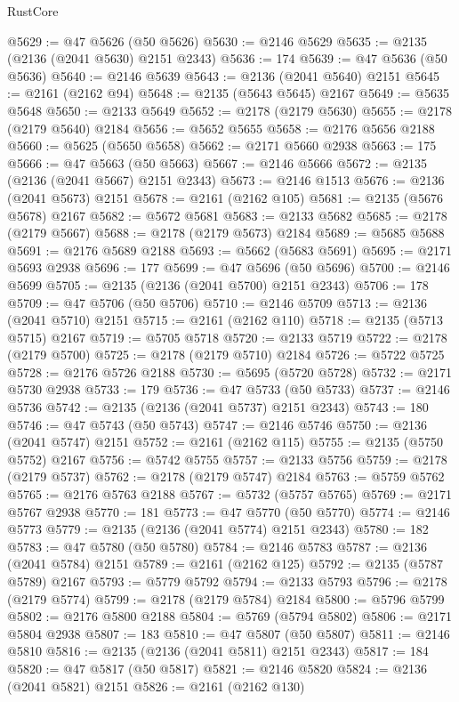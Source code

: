 \begin{lexlean}{RustCore}
\begin{coremodule}
@5629 := @47 @5626 (@50 @5626)
@5630 := @2146 @5629
@5635 := @2135 (@2136 (@2041 @5630) @2151 @2343)
@5636 := 174
@5639 := @47 @5636 (@50 @5636)
@5640 := @2146 @5639
@5643 := @2136 (@2041 @5640) @2151
@5645 := @2161 (@2162 @94)
@5648 := @2135 (@5643 @5645) @2167
@5649 := @5635 @5648
@5650 := @2133 @5649
@5652 := @2178 (@2179 @5630)
@5655 := @2178 (@2179 @5640) @2184
@5656 := @5652 @5655
@5658 := @2176 @5656 @2188
@5660 := @5625 (@5650 @5658)
@5662 := @2171 @5660 @2938
@5663 := 175
@5666 := @47 @5663 (@50 @5663)
@5667 := @2146 @5666
@5672 := @2135 (@2136 (@2041 @5667) @2151 @2343)
@5673 := @2146 @1513
@5676 := @2136 (@2041 @5673) @2151
@5678 := @2161 (@2162 @105)
@5681 := @2135 (@5676 @5678) @2167
@5682 := @5672 @5681
@5683 := @2133 @5682
@5685 := @2178 (@2179 @5667)
@5688 := @2178 (@2179 @5673) @2184
@5689 := @5685 @5688
@5691 := @2176 @5689 @2188
@5693 := @5662 (@5683 @5691)
@5695 := @2171 @5693 @2938
@5696 := 177
@5699 := @47 @5696 (@50 @5696)
@5700 := @2146 @5699
@5705 := @2135 (@2136 (@2041 @5700) @2151 @2343)
@5706 := 178
@5709 := @47 @5706 (@50 @5706)
@5710 := @2146 @5709
@5713 := @2136 (@2041 @5710) @2151
@5715 := @2161 (@2162 @110)
@5718 := @2135 (@5713 @5715) @2167
@5719 := @5705 @5718
@5720 := @2133 @5719
@5722 := @2178 (@2179 @5700)
@5725 := @2178 (@2179 @5710) @2184
@5726 := @5722 @5725
@5728 := @2176 @5726 @2188
@5730 := @5695 (@5720 @5728)
@5732 := @2171 @5730 @2938
@5733 := 179
@5736 := @47 @5733 (@50 @5733)
@5737 := @2146 @5736
@5742 := @2135 (@2136 (@2041 @5737) @2151 @2343)
@5743 := 180
@5746 := @47 @5743 (@50 @5743)
@5747 := @2146 @5746
@5750 := @2136 (@2041 @5747) @2151
@5752 := @2161 (@2162 @115)
@5755 := @2135 (@5750 @5752) @2167
@5756 := @5742 @5755
@5757 := @2133 @5756
@5759 := @2178 (@2179 @5737)
@5762 := @2178 (@2179 @5747) @2184
@5763 := @5759 @5762
@5765 := @2176 @5763 @2188
@5767 := @5732 (@5757 @5765)
@5769 := @2171 @5767 @2938
@5770 := 181
@5773 := @47 @5770 (@50 @5770)
@5774 := @2146 @5773
@5779 := @2135 (@2136 (@2041 @5774) @2151 @2343)
@5780 := 182
@5783 := @47 @5780 (@50 @5780)
@5784 := @2146 @5783
@5787 := @2136 (@2041 @5784) @2151
@5789 := @2161 (@2162 @125)
@5792 := @2135 (@5787 @5789) @2167
@5793 := @5779 @5792
@5794 := @2133 @5793
@5796 := @2178 (@2179 @5774)
@5799 := @2178 (@2179 @5784) @2184
@5800 := @5796 @5799
@5802 := @2176 @5800 @2188
@5804 := @5769 (@5794 @5802)
@5806 := @2171 @5804 @2938
@5807 := 183
@5810 := @47 @5807 (@50 @5807)
@5811 := @2146 @5810
@5816 := @2135 (@2136 (@2041 @5811) @2151 @2343)
@5817 := 184
@5820 := @47 @5817 (@50 @5817)
@5821 := @2146 @5820
@5824 := @2136 (@2041 @5821) @2151
@5826 := @2161 (@2162 @130)

\end{coremodule}
\end{lexlean}
